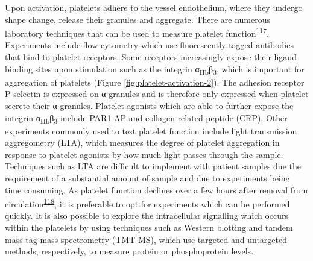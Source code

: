 \documentclass[11pt,twoside]{bristolthesis}
\begin{document}
Upon activation, platelets adhere to the vessel endothelium, where they undergo shape change, release their granules and aggregate. There are numerous laboratory techniques that can be used to measure platelet function\textsuperscript{\protect\hyperlink{ref-Paniccia2015}{117}}. Experiments include flow cytometry which use fluorescently tagged antibodies that bind to platelet receptors. Some receptors increasingly expose their ligand binding sites upon stimulation such as the integrin α\textsubscript{IIb}β\textsubscript{3}, which is important for aggregation of platelets (Figure \ref{fig:platelet-activation-2}). The adhesion receptor P-selectin is expressed on α-granules and is therefore only expressed when platelet secrete their α-granules. Platelet agonists which are able to further expose the integrin α\textsubscript{IIb}β\textsubscript{3} include PAR1-AP and collagen-related peptide (CRP). Other experiments commonly used to test platelet function include light transmission aggregometry (LTA), which measures the degree of platelet aggregation in response to platelet agonists by how much light passes through the sample. Techniques such as LTA are difficult to implement with patient samples due the requirement of a substantial amount of sample and due to experiments being time consuming. As platelet function declines over a few hours after removal from circulation\textsuperscript{\protect\hyperlink{ref-Goss2019}{118}}, it is preferable to opt for experiments which can be performed quickly. It is also possible to explore the intracellular signalling which occurs within the platelets by using techniques such as Western blotting and tandem mass tag mass spectrometry (TMT-MS), which use targeted and untargeted methods, respectively, to measure protein or phosphoprotein levels.
\end{document}
